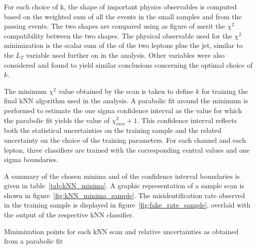 For each choice of k, the shape of important physics observables is computed based on the weighted sum of all the events in the small samples and from the passing events. The two shapes are compared using as figure of merit the $\chi^2$ compatibility between the two shapes. The physical observable used for the $\chi^2$ minimization is the scalar sum of the \pT of the two leptons plus the jet, similar to the $L_T$ variable used further on in the analysis. Other variables were also considered and found to yield similar conclusions concerning the optimal choice of $k$.%

The minimum $\chi^2$ value obtained by the scan is taken to define $k$ for training the final kNN algorithm used in the analysis. %
A parabolic fit around the minimum is performed to estimate the one sigma confidence interval as the value for which the parabolic fit yields the value of $\chi^2_{min} + 1$. %
This confidence interval reflects both the statistical uncertainties on the training sample and the related uncertainty on the choice of the training parameters. For each channel and each lepton, three classifiers are trained with the corresponding central values and one sigma boundaries.

A summary of the chosen minima and of the confidence interval boundaries is given in table~\ref{tab:kNN_minima}. A graphic representation of a sample scan is shown in figure~\ref{fig:kNN_minima_sample}. The misidentification rate observed in the training sample is displayed in figure~\ref{fig:fake_rate_sample}, overlaid with the output of the respective kNN classifier.


\begin{table}

\caption{Minimization points for each kNN scan and relative uncertainties as obtained from a parabolic fit}

\label{tab:kNN_minima}
\end{table}

